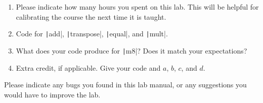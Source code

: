 \documentclass{../../e85}
\date{2019 March 25 (Monday)}
\author{}
\begin{document}
\begin{enumerate}
\item Please indicate how many hours you spent on this lab.  This will
  be helpful for calibrating the course the next time it is taught.

  \begin{solution}

  \end{solution}

\item Code for \texttt|add|, \texttt|transpose|,
  \texttt|equal|, and \texttt|mult|.

  \begin{solution}

  \end{solution}

\item What does your code produce for \texttt|m8|?  Does it
  match your expectations?

  \begin{solution}

  \end{solution}

\item Extra credit, if applicable.  Give your code and \(a\), \(b\),
  \(c\), and \(d\).

  \begin{solution}

  \end{solution}
\end{enumerate}

Please indicate any bugs you found in this lab manual, or any
suggestions you would have to improve the lab.
\end{document}
